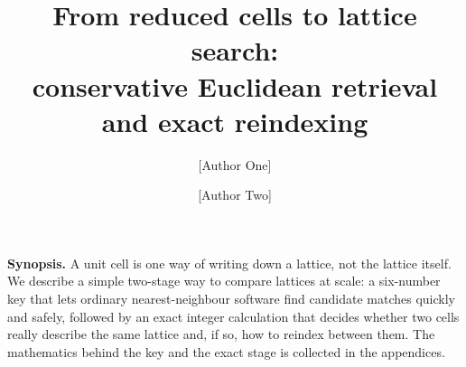 \documentclass[11pt]{article}
\title{\bfseries From reduced cells to lattice search:\\
conservative Euclidean retrieval and exact reindexing}
\author[1]{[Author One]}
\author[1]{[Author Two]}
\affil[1]{[Affiliation], [City], [Country]}
\date{}
\begin{document}
\maketitle

\begin{center}
\begin{minipage}{0.92\textwidth}
\small\noindent\textbf{Synopsis.}
A unit cell is one way of writing down a lattice, not the lattice itself. We describe a simple two-stage way to compare lattices at scale: a six-number key that lets ordinary nearest-neighbour software find candidate matches quickly and safely, followed by an exact integer calculation that decides whether two cells really describe the same lattice and, if so, how to reindex between them. The mathematics behind the key and the exact stage is collected in the appendices.
\end{minipage}
\end{center}
\end{document}
